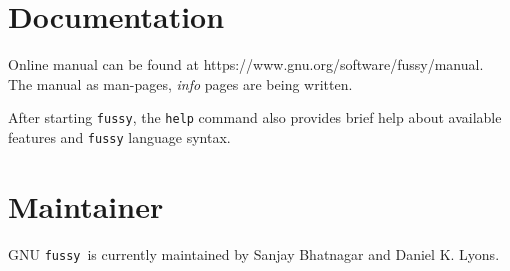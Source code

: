 \documentclass[11pt]{article}
\newcommand{\Fussy}{GNU {\tt fussy}}
\begin{document}
\section*{Documentation}
Online manual can be found at https://www.gnu.org/software/fussy/manual.  The manual as
man-pages, {\it info} pages are being written.

After starting {\tt fussy}, the {\tt help} command also provides brief help about
available features and {\tt fussy} language syntax.


\section*{Maintainer}
\Fussy\ is currently maintained by Sanjay Bhatnagar and Daniel K. Lyons.
\end{document}
